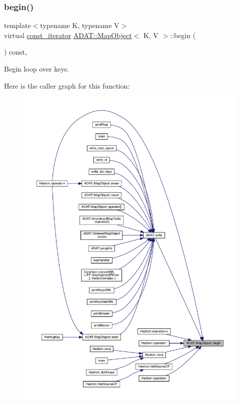 \subsubsection{\texorpdfstring{begin()}{begin()}\hspace{0.1cm}{\footnotesize\ttfamily [1/3]}}
{\footnotesize\ttfamily template$<$typename K, typename V$>$ \\
virtual \mbox{\hyperlink{classADAT_1_1MapObject_a4622cd7d3b6fed18fe226d28091cc6c8}{const\+\_\+iterator}} \mbox{\hyperlink{classADAT_1_1MapObject}{A\+D\+A\+T\+::\+Map\+Object}}$<$ K, V $>$\+::begin (\begin{DoxyParamCaption}{ }\end{DoxyParamCaption}) const\hspace{0.3cm}{\ttfamily [inline]}, {\ttfamily [virtual]}}



Begin loop over keys. 

Here is the caller graph for this function\+:
\nopagebreak
\begin{figure}[H]
\begin{center}
\leavevmode
\includegraphics[width=350pt]{da/d29/classADAT_1_1MapObject_a7f4f6830f0efcc2fcd7bb2aebe0b0c95_icgraph}
\end{center}
\end{figure}
\mbox{\label{classADAT_1_1MapObject_a7f4f6830f0efcc2fcd7bb2aebe0b0c95}} 
